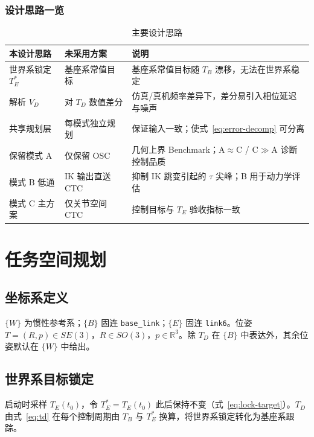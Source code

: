 \documentclass[UTF8, a4paper, 12pt]{ctexart}
\begin{document}
\subsubsection{设计思路一览}
\begin{table}[H]
  \centering
  \caption{主要设计思路}
  \label{tab:design-decisions}
  \renewcommand{\arraystretch}{1.15}
  \begin{tabular}{@{} p{3.0cm} p{3.8cm} p{6.5cm} @{}}
    \toprule
    本设计思路 & 未采用方案 & 说明 \\
    \midrule
    世界系锁定 $T_E^*$ & 基座系常值目标 & 基座系常值目标随 $T_B$ 漂移，无法在世界系稳定 \\
    解析 $V_D$ & 对 $T_D$ 数值差分 & 仿真/真机频率差异下，差分易引入相位延迟与噪声 \\
    共享规划层 & 每模式独立规划 & 保证输入一致；使式~\eqref{eq:error-decomp} 可分离 \\
    保留模式 A & 仅保留 OSC & 几何上界 Benchmark；A$\approx$C / C$\gg$A 诊断控制品质 \\
    模式 B 低通 & IK 输出直送 CTC & 抑制 IK 跳变引起的 $\tau$ 尖峰；B 用于动力学评估 \\
    模式 C 主方案 & 仅关节空间 CTC & 控制目标与 $T_E$ 验收指标一致 \\
    \bottomrule
  \end{tabular}
\end{table}

\section{任务空间规划}

\subsection{坐标系定义}

$\{W\}$ 为惯性参考系；$\{B\}$ 固连 \texttt{base\_link}；$\{E\}$ 固连 \texttt{link6}。位姿 $T=(R,p)\in SE(3)$，$R\in SO(3)$，$p\in\mathbb{R}^3$。除 $T_D$ 在 $\{B\}$ 中表达外，其余位姿默认在 $\{W\}$ 中给出。

\subsection{世界系目标锁定}

启动时采样 $T_E(t_0)$，令 $T_E^*=T_E(t_0)$ 此后保持不变（式~\eqref{eq:lock-target}）。$T_D$ 由式~\eqref{eq:td} 在每个控制周期由 $T_B$ 与 $T_E^*$ 换算，将世界系锁定转化为基座系跟踪。
\end{document}
